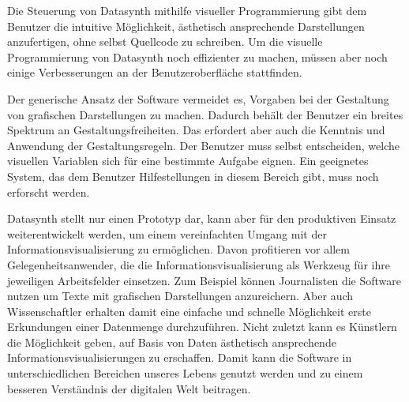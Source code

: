 \documentclass[a4paper, 
               12pt,
               DIV=calc,
               version=first,
               pdftex,
               headsepline,
               footsepline,
               bibtotocnumbered,
               liststotocnumbered]{scrreprt}
\begin{document}
Die Steuerung von Datasynth mithilfe visueller Programmierung gibt dem Benutzer
die intuitive Möglichkeit, ästhetisch ansprechende Darstellungen
anzufertigen, ohne selbst Quellcode zu schreiben. Um die visuelle
Programmierung von Datasynth noch effizienter zu machen, müssen aber
noch einige Verbesserungen an der Benutzeroberfläche stattfinden.

Der generische Ansatz der Software vermeidet es, Vorgaben bei der Gestaltung von
grafischen Darstellungen zu machen. Dadurch behält der Benutzer ein breites Spektrum an Gestaltungsfreiheiten.
Das erfordert aber auch die Kenntnis und Anwendung der Gestaltungsregeln.
Der Benutzer muss selbst entscheiden, welche visuellen Variablen sich für eine
bestimmte Aufgabe eignen. Ein geeignetes System, das dem
Benutzer Hilfestellungen in diesem Bereich gibt, muss noch erforscht werden.

Datasynth stellt nur einen Prototyp dar, kann aber für den
produktiven Einsatz weiterentwickelt werden, um einem vereinfachten Umgang mit
der Informationsvisualisierung zu ermöglichen. Davon profitieren vor allem Gelegenheitsanwender,
die die Informationsvisualisierung als Werkzeug für ihre jeweiligen Arbeitsfelder
einsetzen. Zum Beispiel können Journalisten die Software nutzen um Texte
mit grafischen Darstellungen anzureichern. Aber auch Wissenschaftler
erhalten damit eine einfache und schnelle Möglichkeit
erste Erkundungen einer Datenmenge durchzuführen. Nicht zuletzt kann es Künstlern
die Möglichkeit geben, auf Basis von Daten ästhetisch ansprechende
Informationsvisualisierungen zu erschaffen. Damit kann die Software in unterschiedlichen
Bereichen unseres Lebens genutzt werden und zu einem besseren
Verständnis der digitalen Welt beitragen.
\end{document}
